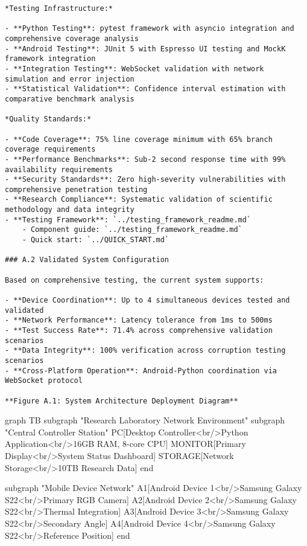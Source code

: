 \documentclass[11pt,a4paper]{report}
\begin{document}
\begin{verbatim}
*Testing Infrastructure:*

- **Python Testing**: pytest framework with asyncio integration and comprehensive coverage analysis
- **Android Testing**: JUnit 5 with Espresso UI testing and MockK framework integration
- **Integration Testing**: WebSocket validation with network simulation and error injection
- **Statistical Validation**: Confidence interval estimation with comparative benchmark analysis

*Quality Standards:*

- **Code Coverage**: 75% line coverage minimum with 65% branch coverage requirements
- **Performance Benchmarks**: Sub-2 second response time with 99% availability requirements
- **Security Standards**: Zero high-severity vulnerabilities with comprehensive penetration testing
- **Research Compliance**: Systematic validation of scientific methodology and data integrity
- **Testing Framework**: `../testing_framework_readme.md`
    - Component guide: `../testing_framework_readme.md`
    - Quick start: `../QUICK_START.md`

### A.2 Validated System Configuration

Based on comprehensive testing, the current system supports:

- **Device Coordination**: Up to 4 simultaneous devices tested and validated
- **Network Performance**: Latency tolerance from 1ms to 500ms
- **Test Success Rate**: 71.4% across comprehensive validation scenarios
- **Data Integrity**: 100% verification across corruption testing scenarios
- **Cross-Platform Operation**: Android-Python coordination via WebSocket protocol

**Figure A.1: System Architecture Deployment Diagram**

\end{verbatim}
graph TB
    subgraph "Research Laboratory Network Environment"
        subgraph "Central Controller Station"
            PC[Desktop Controller<br/>Python Application<br/>16GB RAM, 8-core CPU]
            MONITOR[Primary Display<br/>System Status Dashboard]
            STORAGE[Network Storage<br/>10TB Research Data]
        end

        subgraph "Mobile Device Network"
            A1[Android Device 1<br/>Samsung Galaxy S22<br/>Primary RGB Camera]
            A2[Android Device 2<br/>Samsung Galaxy S22<br/>Thermal Integration]
            A3[Android Device 3<br/>Samsung Galaxy S22<br/>Secondary Angle]
            A4[Android Device 4<br/>Samsung Galaxy S22<br/>Reference Position]
        end
\end{document}
